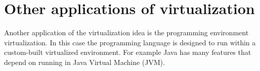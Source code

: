 \section{Other applications of virtualization}
Another application of the virtualization idea is the programming environment virtualization. In this case the programming language is designed to run within a custom-built virtualized environment. For example Java has many features that depend on running in Java Virtual Machine (JVM).